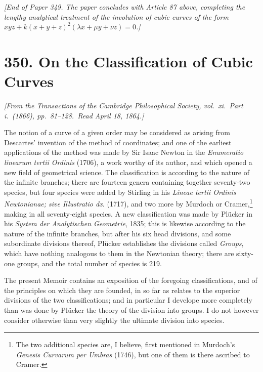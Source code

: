 \documentclass[11pt,a4paper]{article}
\begin{document}
\medskip

\noindent\textit{[End of Paper 349. The paper concludes with Article 87 above, completing the lengthy analytical treatment of the involution of cubic curves of the form $xyz + k(x+y+z)^{2}(\lambda x + \mu y + \nu z) = 0$.]}

\bigskip

\section*{350. On the Classification of Cubic Curves}

\noindent\textit{[From the \textit{Transactions of the Cambridge Philosophical Society}, vol.~xi.\ Part i.\ (1866), pp.~81--128.\ Read April 18, 1864.]}

\medskip

\noindent The notion of a curve of a given order may be considered as arising from Descartes' invention of the method of coordinates; and one of the earliest applications of the method was made by Sir Isaac Newton in the \emph{Enumeratio linearum tertii Ordinis} (1706), a work worthy of its author, and which opened a new field of geometrical science. The classification is according to the nature of the infinite branches; there are fourteen genera containing together seventy-two species, but four species were added by Stirling in his \emph{Lineae tertii Ordinis Newtonianae; sive Illustratio dx.} (1717), and two more by Murdoch or Cramer,\footnote{The two additional species are, I believe, first mentioned in Murdoch's \emph{Genesis Curvarum per Umbras} (1746), but one of them is there ascribed to Cramer.} making in all seventy-eight species. A new classification was made by Pl\"ucker in his \emph{System der Analytischen Geometrie}, 1835; this is likewise according to the nature of the infinite branches, but after his six head divisions, and some subordinate divisions thereof, Pl\"ucker establishes the divisions called \emph{Groups}, which have nothing analogous to them in the Newtonian theory; there are sixty-one groups, and the total number of species is 219.

The present Memoir contains an exposition of the foregoing classifications, and of the principles on which they are founded, in so far as relates to the superior divisions of the two classifications; and in particular I develope more completely than was done by Pl\"ucker the theory of the division into groups. I do not however consider otherwise than very slightly the ultimate division into species.
\end{document}

